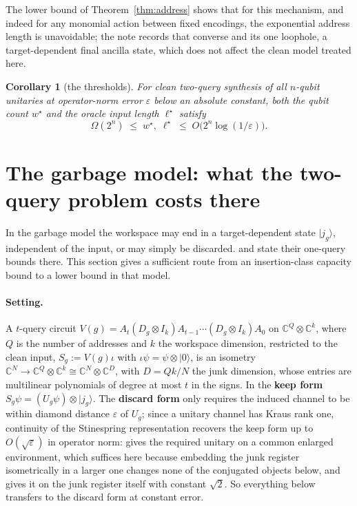 \documentclass[11pt,a4paper]{article}
\theoremstyle{plain}
\newtheorem{corollary}[theorem]{Corollary}
\theoremstyle{definition}
\theoremstyle{remark}
\newcommand{\C}{\mathbb C}
\begin{document}
The lower bound of Theorem~\ref{thm:address} shows that for this mechanism, and indeed for
any monomial action between fixed encodings, the exponential address length is unavoidable;
the note records that converse and its one loophole, a target-dependent final ancilla
state, which does not affect the clean model treated here.

\begin{corollary}[the thresholds]\label{cor:thresholds}
For clean two-query synthesis of all $n$-qubit unitaries at operator-norm error
$\varepsilon$ below an absolute constant, both the qubit count $w^{\star}$ and the oracle
input length $\ell^{\star}$ satisfy
\[
\Omega(2^n)\;\le\;w^{\star},\;\ell^{\star}\;\le\;O\bigl(2^n\log(1/\varepsilon)\bigr).
\]
\end{corollary}

\section{The garbage model: what the two-query problem costs there}\label{sec:garbage}

In the garbage model the workspace may end in a target-dependent state $|j_g\rangle$,
independent of the input, or may simply be discarded. \cite{LMW24} and \cite{DLM26} state
their one-query bounds there. This section gives a sufficient route from an
insertion-class capacity bound to a lower bound in that model.

\paragraph{Setting.} A $t$-query circuit
$V(g)=A_t(D_g\otimes I_k)A_{t-1}\cdots(D_g\otimes I_k)A_0$ on $\C^Q\otimes\C^k$, where $Q$ is the
number of addresses and $k$ the workspace dimension, restricted to the clean input,
$S_g:=V(g)\iota$ with $\iota\psi=\psi\otimes|0\rangle$, is an isometry
$\C^N\to\C^Q\otimes\C^k\cong\C^N\otimes\C^D$, with $D=Qk/N$ the junk dimension, whose entries are
multilinear polynomials of degree at most $t$ in the signs. In the \textbf{keep form}
$S_g\psi=(U_g\psi)\otimes|j_g\rangle$. The \textbf{discard form} only requires the induced
channel to be within diamond distance $\varepsilon$ of $U_g$; since a unitary channel has
Kraus rank one, continuity of the Stinespring representation recovers the keep form up to
$O(\sqrt\varepsilon)$ in operator norm: \cite{KSW08} gives the required unitary on a common
enlarged environment, which suffices here because embedding the junk register isometrically
in a larger one changes none of the conjugated objects below, and \cite{vE23} gives it on
the junk register itself with constant $\sqrt2$. So everything below transfers to the
discard form at constant error.
\end{document}
